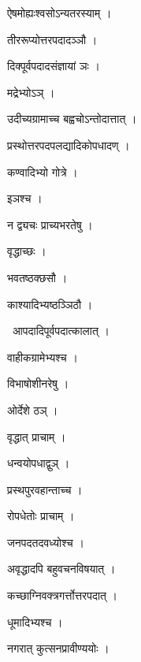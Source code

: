 \documentclass[10pt, openany, oneside]{book}
\begin{document}
\noindent ऐषमोह्यःश्वसोऽन्यतरस्याम् ।

\noindent तीररूप्योत्तरपदादञ्ञौ ।

\noindent दिक्पूर्वपदादसंज्ञायां ञः ।

\noindent मद्रेभ्योऽञ् ।

\noindent उदीच्यग्रामाच्च बह्वचोऽन्तोदात्तात् ।

\noindent प्रस्थोत्तरपदपलद्यादिकोपधादण् ।

\noindent कण्वादिभ्यो गोत्रे ।

\noindent इञश्च ।

\noindent न द्व्यचः प्राच्यभरतेषु ।

\noindent वृद्धाच्छः ।

\noindent भवतष्ठक्छसौ ।

\noindent काश्यादिभ्यष्ठञ्ञिठौ ।

\par\noindent\hspace{1.5em}{\vps वा॰}~{\qt आपदादिपूर्वपदात्कालात् ।}

\noindent वाहीकग्रामेभ्यश्च ।

\noindent विभाषोशीनरेषु ।

\noindent ओर्देशे ठञ् ।

\noindent वृद्धात् प्राचाम् ।

\noindent धन्वयोपधाद्वुञ् ।

\noindent प्रस्थपुरवहान्ताच्च ।

\noindent रोपधेतोः प्राचाम् ।

\noindent जनपदतदवध्योश्च ।

\noindent अवृद्धादपि बहुवचनविषयात् ।

\noindent कच्छाग्निवक्त्रगर्त्तोत्तरपदात् ।

\noindent धूमादिभ्यश्च ।

\noindent नगरात् कुत्सनप्रावीण्ययोः ।
\end{document}
